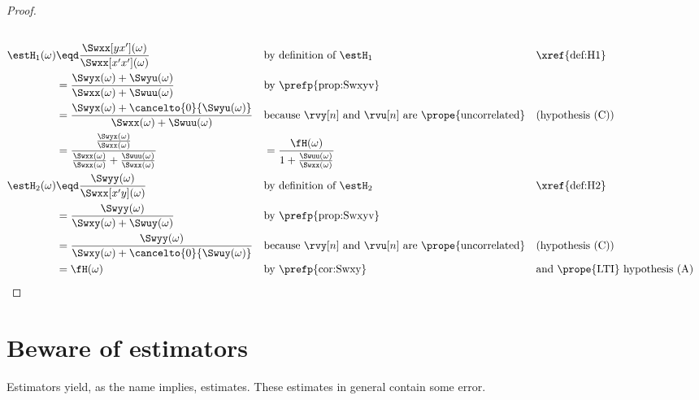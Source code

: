 \begin{proof}
\begin{align*}
  \\
  \estH_1(\omega)
    &\eqd \frac{\Swxx[yx'](\omega)}{\Swxx[x'x'](\omega)}
    && \text{by definition of $\estH_1$}
    && \text{\xref{def:H1}}
  \\&= \frac{\Swyx(\omega) + \Swyu(\omega)}
            {\Swxx(\omega) + \Swuu(\omega)}
    && \text{by \prefp{prop:Swxyv}}
  \\&= \frac{\Swyx(\omega) + \cancelto{0}{\Swyu(\omega)}}
            {\Swxx(\omega) + \Swuu(\omega)}
    && \text{because $\rvy[n]$ and $\rvu[n]$ are \prope{uncorrelated}}
    && \text{(hypothesis (C))}
  \\&= \frac{\frac{\Swyx(\omega)}{\Swxx(\omega)}}
            {\frac{\Swxx(\omega)}{\Swxx(\omega)} + \frac{\Swuu(\omega)}{\Swxx(\omega)}}
   &&= \frac{\fH(\omega)}
            {1 + \frac{\Swuu(\omega)}{\Swxx(\omega)}}
  \\
  \estH_2(\omega)
    &\eqd \frac{\Swyy(\omega)}{\Swxx[x'y](\omega)}
    && \text{by definition of $\estH_2$}
    && \text{\xref{def:H2}}
  \\&= \frac{\Swyy(\omega)}{\Swxy(\omega) + \Swuy(\omega)}
    && \text{by \prefp{prop:Swxyv}}
  \\&= \frac{\Swyy(\omega)}{\Swxy(\omega) + \cancelto{0}{\Swuy(\omega)}}
    && \text{because $\rvy[n]$ and $\rvu[n]$ are \prope{uncorrelated}}
    && \text{(hypothesis (C))}
  \\&= \fH(\omega)
    && \text{by \prefp{cor:Swxy}}
    && \text{and \prope{LTI} hypothesis (A)}
\end{align*}
\end{proof}

\section{Beware of estimators}
Estimators yield, as the name implies, estimates.
These estimates in general contain some error.

